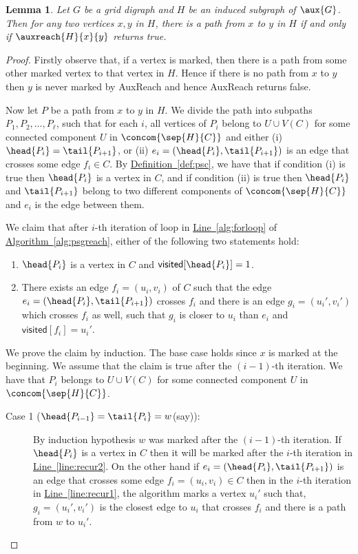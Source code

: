 \documentclass[11pt]{article}
\numberwithin{equation}{section}
\newtheorem{lemma}[theorem]{Lemma}
\theoremstyle{definition}
\theoremstyle{plain}
\newcommand{\expref}[2]{\hyperref[#2]{#1~\ref{#2}}}
\begin{document}
\begin{lemma}
\label{lem:algo_correctness}
Let $G$ be a grid %
digraph %
 and $H$ be %
an%
induced subgraph of $\aux{G}$. Then for any two vertices $x,y$ in $H$, there is a path from $x$ to $y$ in $H$ if and only if $\auxreach{H}{x}{y}$ returns \textsf{true}.
\end{lemma}
\begin{proof}
Firstly observe that, if a vertex is marked, then there is a path from some other marked vertex to that vertex in $H$. Hence if there is no path from $x$ to $y$ then $y$ is never marked by \textsf{AuxReach} and hence \textsf{AuxReach} returns \textsf{false}.

Now let $P$ be a path from $x$ to $y$ in $H$. We divide the path into subpaths $P_1, P_2 , \ldots , P_{\ell}$, such that for each $i$, all vertices of $P_i$ belong to $U \cup V(C)$ for some connected component $U$ in $\concom{\sep{H}{C}}$ and either (i) $\head{P_i} = \tail{P_{i+1}}$, or (ii) $e_i = (\head{P_i} , \tail{P_{i+1}})$ is an edge that crosses some edge $f_i \in C$. By \expref{Definition}{def:psc}, we have that if condition (i) is true then $\head{P_i}$ is a vertex in $C$, and if condition (ii) is true then $\head{P_i}$ and $\tail{P_{i+1}}$ belong to two different components of $\concom{\sep{H}{C}}$ and $e_i$ is the edge between them.

We claim that after $i$-th iteration of loop in \expref{Line}{alg:forloop} of \expref{Algorithm}{alg:psgreach}, either of the following two statements hold:
\begin{enumerate}
\item $\head{P_i}$ is a vertex in $C$ and $\textsf{visited}[\head{P_i}] = 1$.
\item There exists an edge $f_i = (u_i, v_i)$ of $C$ such that the edge $e_i = (\head{P_i}, \tail{P_{i+1}})$ crosses $f_i$ and there is an edge $g_i = (u_i',v_i')$ which crosses $f_i$ as well, such that $g_i$ is closer to $u_i$ than $e_i$ and $\textsf{visited}[f_i] = u_i'$.
\end{enumerate}
We prove the claim by induction. The base case holds since $x$ is marked at the beginning. We assume that the claim is true after the $(i-1)$-th iteration. We have that $P_i$ belongs to $U \cup V(C)$ for some connected component $U$ in $\concom{\sep{H}{C}}$.
\begin{description}
\item[Case 1 ($\head{P_{i-1}} = \tail{P_{i}} = w$(say)):] By induction hypothesis $w$ was marked after the $(i-1)$-th iteration. If $\head{P_i}$ is a vertex in $C$ then it will be marked after the $i$-th iteration in \expref{Line}{line:recur2}. On the other hand if $e_i = (\head{P_i} , \tail{P_{i+1}})$ is an edge that crosses some edge $f_i = (u_i,v_i) \in C$ then in the $i$-th iteration in \expref{Line}{line:recur1}, the algorithm marks a vertex $u_i'$ such that, $g_i = (u_i',v_i')$ is the closest edge to $u_i$ that crosses $f_i$ and there is a path from $w$ to $u_i'$.


\end{description}
\end{proof}
\end{document}

